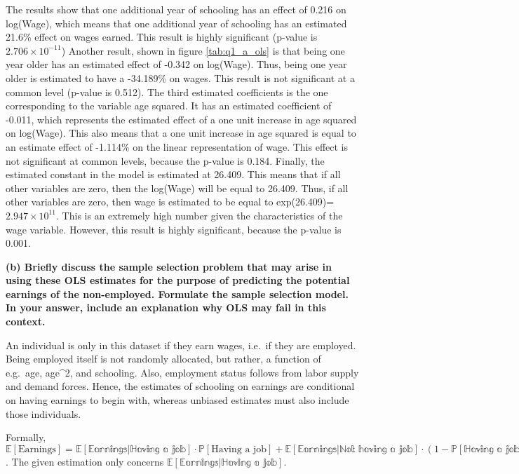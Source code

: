 \documentclass[
]{article}
\begin{document}
The results show that one additional year of schooling has an effect of
0.216 on log(Wage), which means that one additional year of schooling
has an estimated 21.6\% effect on wages earned. This result is highly
significant (p-value is \ensuremath{2.706\times 10^{-11}}) Another
result, shown in figure \ref{tab:q1_a_ols} is that being one year older
has an estimated effect of -0.342 on log(Wage). Thus, being one year
older is estimated to have a -34.189\% on wages. This result is not
significant at a common level (p-value is 0.512). The third estimated
coefficients is the one corresponding to the variable age squared. It
has an estimated coefficient of -0.011, which represents the estimated
effect of a one unit increase in age squared on log(Wage). This also
means that a one unit increase in age squared is equal to an estimate
effect of -1.114\% on the linear representation of wage. This effect is
not significant at common levels, because the p-value is 0.184. Finally,
the estimated constant in the model is estimated at 26.409. This means
that if all other variables are zero, then the log(Wage) will be equal
to 26.409. Thus, if all other variables are zero, then wage is estimated
to be equal to exp(26.409)=\ensuremath{2.947\times 10^{11}}. This is an
extremely high number given the characteristics of the wage variable.
However, this result is highly significant, because the p-value is
0.001.

\textbf{(b) Briefly discuss the sample selection problem that may arise
in using these OLS estimates for the purpose of predicting the potential
earnings of the non-employed. Formulate the sample selection model. In
your answer, include an explanation why OLS may fail in this context.}

An individual is only in this dataset if they earn wages, i.e.~if they
are employed. Being employed itself is not randomly allocated, but
rather, a function of e.g.~age, age\^{}2, and schooling. Also,
employment status follows from labor supply and demand forces. Hence,
the estimates of schooling on earnings are conditional on having
earnings to begin with, whereas unbiased estimates must also include
those individuals.

Formally,
\(\mathbb{E}[\text{Earnings}] = \mathbb{E[\text{Earnings}|\text{Having a job}]} \cdot \mathbb{P}[\text{Having a job}] + \mathbb{E[\text{Earnings}|\text{Not having a job}]} \cdot (1-\mathbb{P[\text{Having a job}]})\).
The given estimation only concerns
\(\mathbb{E[\text{Earnings}|\text{Having a job}]}\).
\end{document}
